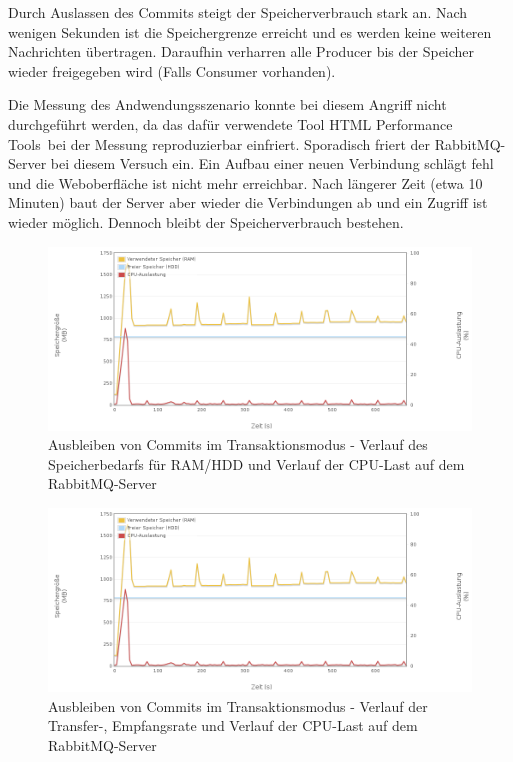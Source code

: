 \documentclass[	a4paper,
			11pt,
			oneside,
			parskip]{scrartcl}
\begin{document}
	
	\clearpage
		{
		  \newline
		  \newline
		  \newline
		}{
		 Durch Auslassen des Commits steigt der Speicherverbrauch stark an. Nach wenigen Sekunden ist die Speichergrenze erreicht und es werden keine weiteren Nachrichten übertragen. Daraufhin verharren alle Producer bis der Speicher wieder freigegeben wird (Falls Consumer vorhanden).
		}{
		 Die Messung des Andwendungsszenario konnte bei diesem Angriff nicht durchgeführt werden, da das dafür verwendete Tool \glqq HTML Performance Tools\grqq\ bei der Messung reproduzierbar einfriert. Sporadisch friert der RabbitMQ-Server bei diesem Versuch ein. Ein Aufbau einer neuen Verbindung schlägt fehl und die Weboberfläche ist nicht mehr erreichbar. Nach längerer Zeit (etwa 10 Minuten) baut der Server aber wieder die Verbindungen ab und ein Zugriff ist wieder möglich. Dennoch bleibt der Speicherverbrauch bestehen.

		}

		\begin{figure}[!htb]
			\centering
			\includegraphics[width=\textwidth]{img/tx/tx_server1.png}
			\caption{Ausbleiben von Commits im Transaktionsmodus - Verlauf des Speicherbedarfs für RAM/HDD und Verlauf der CPU-Last auf dem RabbitMQ-Server}
			\label{fig:commit-server1}
		\end{figure}
		
		\begin{figure}[!htb]
			\centering
			\includegraphics[width=\textwidth]{img/tx/tx_server1.png}
			\caption{Ausbleiben von Commits im Transaktionsmodus - Verlauf der Transfer-, Empfangsrate und Verlauf der CPU-Last auf dem RabbitMQ-Server}
			\label{fig:commit-server2}
		\end{figure}
	
\end{document}
